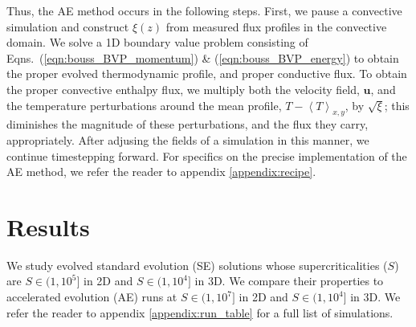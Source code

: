 \documentclass[aps, pre, onecolumn, nofootinbib, notitlepage, groupedaddress, amsfonts, amssymb, amsmath, longbibliography]{revtex4-1}
\newcommand{\angles}[1]{\ensuremath{\left\langle #1 \right\rangle}}
\begin{document}
Thus, the AE method occurs in the following steps. First, we pause a convective simulation and
construct $\xi(z)$ from measured flux profiles in the convective domain.
We solve a 1D boundary value problem consisting of
Eqns.~(\ref{eqn:bouss_BVP_momentum}) \& (\ref{eqn:bouss_BVP_energy})
to obtain the proper evolved thermodynamic profile, and proper conductive flux.
To obtain the proper convective enthalpy flux, we multiply both the velocity field,
$\bm{u}$, and the temperature perturbations around the mean profile, $T - \angles{T}_{x,y}$,
by $\sqrt{\xi}$; this diminishes the magnitude of these perturbations, and the
flux they carry, appropriately.
After adjusing the fields of a simulation in this manner, we continue timestepping forward.
For specifics on the precise implementation of the AE method, we refer
the reader to appendix \ref{appendix:recipe}.


\section{Results}
\label{sec:results}
We study evolved standard evolution (SE) solutions whose supercriticalities ($S$) are 
$S \in (1, 10^5]$ in 2D and $S \in (1, 10^4]$ in
3D. We compare their properties to
accelerated evolution (AE) runs at $S \in (1, 10^7]$ in 2D and
$S \in (1, 10^4]$ in 3D.
We refer the reader to appendix \ref{appendix:run_table} for a full list of
simulations.
\end{document}
